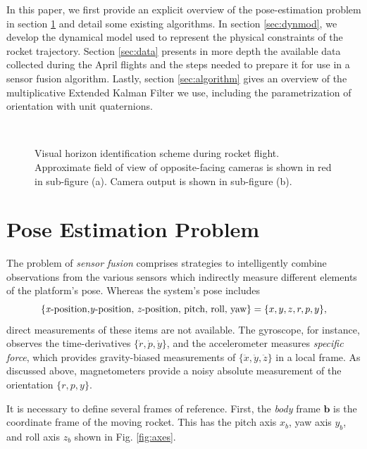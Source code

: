 \documentclass{article}
\begin{document}
In this paper, we first provide an explicit overview of the pose-estimation problem in section \ref{sec:posest} and detail some existing algorithms. In section \ref{sec:dynmod}, we develop the dynamical model used to represent the physical constraints of the rocket trajectory. Section \ref{sec:data} presents in more depth the available data collected during the April flights and the steps needed to prepare it for use in a sensor fusion algorithm. Lastly, section \ref{sec:algorithm} gives an overview of the multiplicative Extended Kalman Filter we use, including the parametrization of orientation with unit quaternions.

\begin{figure}[ht]%
 \centering
 \\
 \caption{Visual horizon identification scheme during rocket flight. Approximate field of view of opposite-facing cameras is shown in red in sub-figure (a). Camera output is shown in sub-figure (b).}%
 \label{fig:horizon_overview}%
\end{figure}

\section{Pose Estimation Problem} \label{sec:posest}
The problem of \textit{sensor fusion} comprises strategies to intelligently combine observations from the various sensors which indirectly measure different elements of the platform's pose. Whereas the system's pose includes
\[
\{\text{\textit{x}-position,\textit{y}-position, \textit{z}-position, pitch, roll, yaw}\}
= \{x, y, z, r, p, y\},
\]
direct measurements of these items are not available. The gyroscope, for instance, observes the time-derivatives $\{\dot{r}, \dot{p}, \dot{y}\}$, and the accelerometer measures \textit{specific force}, which provides gravity-biased measurements of $\{\ddot{x}, \ddot{y}, \ddot{z} \}$ in a local frame. As discussed above, magnetometers provide a noisy absolute measurement of the orientation $\{r, p, y\}$. 

It is necessary to define several frames of reference. First, the \textit{body} frame $\textbf{b}$ is the coordinate frame of the moving rocket. This has the pitch axis $x_b$, yaw axis $y_b$, and roll axis $z_b$ shown in Fig. \ref{fig:axes}. 
\end{document}
